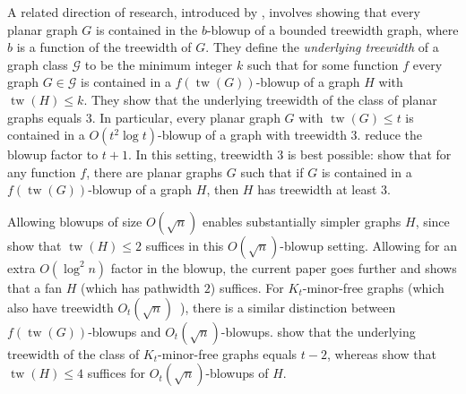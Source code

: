 \documentclass{patmorin}
\renewcommand{\le}{\leqslant}
\renewcommand{\leq}{\leqslant}
\newcommand{\defin}[1]{\emph{\textcolor{brightmaroon}{#1}}}
\DeclareMathOperator{\tw}{tw}
\newcommand{\GG}{\mathcal{G}}
\begin{document}

A related direction of research, introduced by \citet{UTW}, involves showing that every planar graph $G$ is contained in the $b$-blowup of a bounded treewidth graph, where $b$ is a function of the treewidth of $G$. They define the \defin{underlying treewidth} of a graph class $\GG$ to be the minimum integer $k$ such that for some function $f$ every graph $G\in\GG$ is contained in a $f(\tw(G))$-blowup of a graph $H$ with $\tw(H)\leq k$. They show that the underlying treewidth of the class of planar graphs equals 3. In particular, every planar graph $G$ with $\tw(G)\leq t$ is contained in a $O(t^2\log t)$-blowup of a graph with treewidth $3$. \citet{ISW} reduce the blowup factor to $t+1$.
In this setting, treewidth 3 is best possible: \citet{UTW} show that for any function $f$, there are planar graphs $G$ such that if $G$ is contained in a $f(\tw(G))$-blowup of a graph $H$, then $H$ 
has treewidth at least 3. 

Allowing blowups of size $O(\sqrt{n})$ enables substantially simpler graphs $H$, since \citet{distel.dujmovic.ea:product} show that $\tw(H)\leq 2$ suffices in this $O(\sqrt{n})$-blowup setting. Allowing for an extra $O(\log^2n)$ factor in the blowup, the current paper goes further and shows that a fan $H$ (which has pathwidth $2$) suffices. For $K_t$-minor-free graphs (which also have treewidth $O_t(\sqrt{n})$~\citep{ast90}), there is a similar distinction between $f(\tw(G))$-blowups and $O_t(\sqrt{n})$-blowups. \citet{UTW} show that the underlying treewidth of the class of $K_t$-minor-free graphs equals $t-2$, whereas
\citet{distel.dujmovic.ea:product} show that $\tw(H)\leq 4$ suffices for $O_t(\sqrt{n})$-blowups of $H$. 



\end{document}
